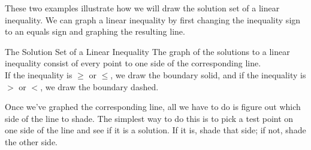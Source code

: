 These two examples illustrate how we will draw the solution set of a linear inequality.  We can graph a linear inequality by first changing the inequality sign to an equals sign and graphing the resulting line.
\begin{proc}{The Solution Set of a Linear Inequality}
The graph of the solutions to a linear inequality consist of every point to one side of the corresponding line.\\

If the inequality is $\geq$ or $\leq$, we draw the boundary solid, and if the inequality is $>$ or $<$, we draw the boundary dashed.
\end{proc}

Once we've graphed the corresponding line, all we have to do is figure out which side of the line to shade.  The simplest way to do this is to pick a test point on one side of the line and see if it is a solution.  If it is, shade that side; if not, shade the other side.

